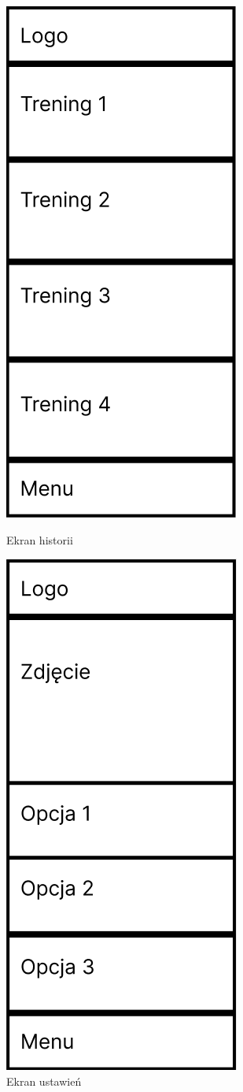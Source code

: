 \begin{figure}[!htb]
	\centering
	\begin{minipage}{.5\textwidth}
		\centering
		\includegraphics[width=.4\linewidth]{rys/ekran_historii.png}
		\caption{Ekran historii}
		\label{rys:rysunek005}
	\end{minipage}%
	\begin{minipage}{.5\textwidth}
		\centering
		\includegraphics[width=.4\linewidth]{rys/ekran_ustawien.png}
		\caption{Ekran ustawień}
		\label{rys:rysunek006}
	\end{minipage}
\end{figure} 

